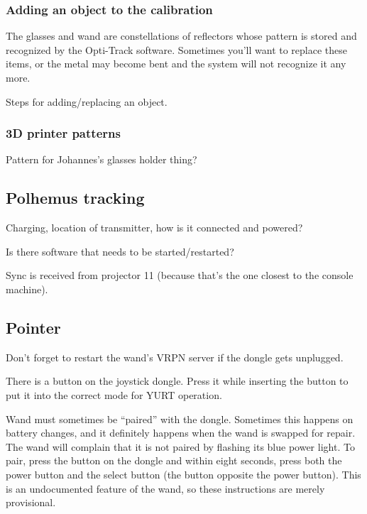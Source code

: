 \documentclass[11pt]{article}
\begin{document}
\subsubsection{Adding an object to the calibration}

The glasses and wand are constellations of reflectors whose pattern is
stored and recognized by the Opti-Track software.  Sometimes you'll
want to replace these items, or the metal may become bent and the
system will not recognize it any more.

Steps for adding/replacing an object.


\subsubsection{3D printer patterns}

Pattern for Johannes's glasses holder thing?




\subsection{Polhemus tracking}


Charging, location of transmitter, how is it connected and powered?

Is there software that needs to be started/restarted?

Sync is received from projector 11 (because that's the one closest to
the console machine).


\subsection{Pointer}

Don't forget to restart the wand's VRPN server if the dongle gets unplugged.


There is a button on the joystick dongle.  Press it while inserting
the button to put it into the correct mode for YURT operation.

Wand must sometimes be ``paired'' with the dongle.  Sometimes this
happens on battery changes, and it definitely happens when the wand is
swapped for repair.  The wand will complain that it is not paired by
flashing its blue power light.  To pair, press the button on the
dongle and within eight seconds, press both the power button and the
select button (the button opposite the power button).  This is an
undocumented feature of the wand, so these instructions are merely
provisional.
\end{document}
